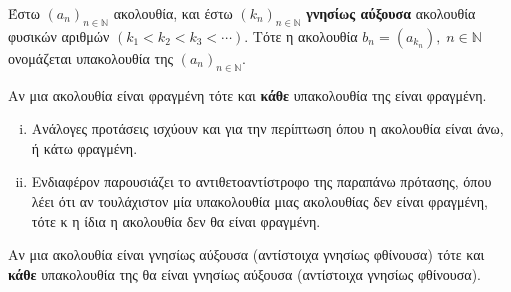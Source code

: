 \begin{mybox1}
  \begin{dfn}
    Έστω $ (a_{n})_{n \in \mathbb{N}} $ ακολουθία, και έστω $ 
    (k_{n})_{n \in \mathbb{N}} $ \textbf{γνησίως αύξουσα} ακολουθία φυσικών αριθμών $ (k_{1}<k_{2}<k_{3}<\cdots) $. 
    Τότε η ακολουθία $ b_{n} = (a_{k_{n}}), \; n \in \mathbb{N} $ 
    ονομάζεται \textcolor{Col1}{υπακολουθία} της 
    $ (a_{n})_{n \in \mathbb{N}} $.
  \end{dfn}
\end{mybox1}


\begin{mybox3}
  \begin{prop}
    Αν μια ακολουθία είναι φραγμένη τότε και \textbf{κάθε} υπακολουθία της 
    είναι φραγμένη.
  \end{prop}
\end{mybox3}

\begin{rem}
\item {}
  \begin{enumerate}[i)]
    \item Ανάλογες προτάσεις ισχύουν και για την περίπτωση όπου η 
      ακολουθία είναι άνω, ή κάτω φραγμένη.
    \item 
      Ενδιαφέρον παρουσιάζει το αντιθετοαντίστροφο της παραπάνω 
      πρότασης, όπου λέει ότι αν τουλάχιστον μία υπακολουθία μιας 
      ακολουθίας δεν είναι φραγμένη, τότε κ η ίδια η ακολουθία 
      δεν θα είναι φραγμένη.
  \end{enumerate}
\end{rem}

\begin{mybox3}
  \begin{prop}
    Αν μια ακολουθία είναι γνησίως αύξουσα (αντίστοιχα γνησίως φθίνουσα) 
    τότε και \textbf{κάθε} υπακολουθία της θα είναι γνησίως αύξουσα (αντίστοιχα 
    γνησίως φθίνουσα).
  \end{prop}
\end{mybox3}

